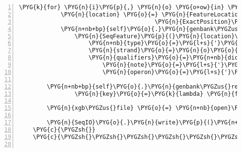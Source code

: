 \begin{Verbatim}[commandchars=\\\{\},numbers=left,firstnumber=1,stepnumber=5]
        \PYG{k}{for} \PYG{n}{i}\PYG{p}{,} \PYG{n}{o} \PYG{o+ow}{in} \PYG{n+nb}{enumerate}\PYG{p}{(}\PYG{n+nb+bp}{self}\PYG{o}{.}\PYG{n}{operons}\PYG{p}{)}\PYG{p}{:}
            \PYG{n}{location} \PYG{o}{=} \PYG{n}{FeatureLocation}\PYG{p}{(}\PYG{n}{ExactPosition}\PYG{p}{(}\PYG{n}{o}\PYG{o}{.}\PYG{n}{begin}\PYG{p}{)}\PYG{p}{,}
                                       \PYG{n}{ExactPosition}\PYG{p}{(}\PYG{n}{o}\PYG{o}{.}\PYG{n}{end}\PYG{p}{)}\PYG{p}{)}
            \PYG{n+nb+bp}{self}\PYG{o}{.}\PYG{n}{genbank\PYGZus{}record}\PYG{o}{.}\PYG{n}{features}\PYG{o}{.}\PYG{n}{append}\PYG{p}{(}
                \PYG{n}{SeqFeature}\PYG{p}{(}\PYG{n}{location}\PYG{p}{,}
                    \PYG{n+nb}{type}\PYG{o}{=}\PYG{l+s}{'}\PYG{l+s}{mRNA}\PYG{l+s}{'}\PYG{p}{,}
                    \PYG{n}{strand}\PYG{o}{=}\PYG{n}{o}\PYG{o}{.}\PYG{n}{strand}\PYG{p}{,}
                    \PYG{n}{qualifiers}\PYG{o}{=}\PYG{n+nb}{dict}\PYG{p}{(}
                        \PYG{n}{note}\PYG{o}{=}\PYG{l+s}{'}\PYG{l+s}{putative, confidence }\PYG{l+s+si}{\PYGZpc{}d}\PYG{l+s+si}{\PYGZpc{}\PYGZpc{}}\PYG{l+s}{'} \PYG{o}{\PYGZpc{}} \PYG{n}{o}\PYG{o}{.}\PYG{n}{confidence}\PYG{p}{,}
                        \PYG{n}{operon}\PYG{o}{=}\PYG{l+s}{'}\PYG{l+s}{rnas-}\PYG{l+s+si}{\PYGZpc{}d}\PYG{l+s}{'} \PYG{o}{\PYGZpc{}} \PYG{n}{i}\PYG{p}{)}\PYG{p}{)}\PYG{p}{)}

        \PYG{n+nb+bp}{self}\PYG{o}{.}\PYG{n}{genbank\PYGZus{}record}\PYG{o}{.}\PYG{n}{features}\PYG{o}{.}\PYG{n}{sort}\PYG{p}{(}
                \PYG{n}{key}\PYG{o}{=}\PYG{k}{lambda} \PYG{n}{f}\PYG{p}{:} \PYG{n}{f}\PYG{o}{.}\PYG{n}{location}\PYG{o}{.}\PYG{n}{start}\PYG{o}{.}\PYG{n}{position}\PYG{p}{)}

        \PYG{n}{xgb\PYGZus{}file} \PYG{o}{=} \PYG{n+nb}{open}\PYG{p}{(}\PYG{n+nb+bp}{self}\PYG{o}{.}\PYG{n}{analysis}\PYG{o}{.}\PYG{n}{xgenbankfile\PYGZus{}path}\PYG{p}{,} \PYG{l+s}{"}\PYG{l+s}{w}\PYG{l+s}{"}\PYG{p}{)}

        \PYG{n}{SeqIO}\PYG{o}{.}\PYG{n}{write}\PYG{p}{(}\PYG{n+nb+bp}{self}\PYG{o}{.}\PYG{n}{genbank\PYGZus{}record}\PYG{p}{,} \PYG{n}{xgb\PYGZus{}file}\PYG{p}{,} \PYG{l+s}{"}\PYG{l+s}{genbank}\PYG{l+s}{"}\PYG{p}{)}
    \PYG{c}{\PYGZsh{}}
    \PYG{c}{\PYGZsh{}\PYGZsh{}\PYGZsh{}\PYGZsh{}\PYGZsh{}\PYGZsh{}\PYGZsh{}\PYGZsh{}\PYGZsh{}\PYGZsh{}\PYGZsh{}\PYGZsh{}\PYGZsh{}\PYGZsh{}\PYGZsh{}\PYGZsh{}\PYGZsh{}\PYGZsh{}\PYGZsh{}\PYGZsh{}\PYGZsh{}\PYGZsh{}\PYGZsh{}\PYGZsh{}\PYGZsh{}\PYGZsh{}\PYGZsh{}\PYGZsh{}\PYGZsh{}\PYGZsh{}\PYGZsh{}\PYGZsh{}\PYGZsh{}\PYGZsh{}\PYGZsh{}\PYGZsh{}\PYGZsh{}\PYGZsh{}\PYGZsh{}\PYGZsh{}\PYGZsh{}\PYGZsh{}\PYGZsh{}\PYGZsh{}\PYGZsh{}\PYGZsh{}\PYGZsh{}\PYGZsh{}\PYGZsh{}\PYGZsh{}\PYGZsh{}\PYGZsh{}\PYGZsh{}\PYGZsh{}\PYGZsh{}\PYGZsh{}\PYGZsh{}\PYGZsh{}\PYGZsh{}\PYGZsh{}\PYGZsh{}\PYGZsh{}\PYGZsh{}\PYGZsh{}\PYGZsh{}\PYGZsh{}\PYGZsh{}\PYGZsh{}\PYGZsh{}\PYGZsh{}\PYGZsh{}\PYGZsh{}\PYGZsh{}\PYGZsh{}\PYGZsh{}\PYGZsh{}}


\end{Verbatim}
